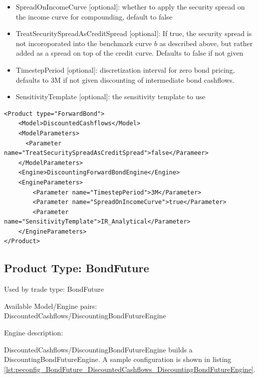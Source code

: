 \begin{itemize}
\item SpreadOnIncomeCurve [optional]: whether to apply the security spread on the income curve for compounding, default to false
\item TreatSecuritySpreadAsCreditSpread [optional]: If true, the security spread is not incoroporated into the benchmark curve $b$
  as described above, but rather added as a spread on top of the credit curve. Defaults to false if not given
\item TimestepPeriod [optional]: discretization interval for zero bond pricing, defaults to 3M if not given
  discounting of intermediate bond cashflows.
\item SensitivityTemplate [optional]: the sensitivity template to use
\end{itemize}

\begin{longlisting}
\begin{verbatim}
<Product type="ForwardBond">
    <Model>DiscountedCashflows</Model>
    <ModelParameters>
      <Parameter name="TreatSecuritySpreadAsCreditSpread">false</Parameer>
    </ModelParameters>
    <Engine>DiscountingForwardBondEngine</Engine>
    <EngineParameters>
        <Parameter name="TimestepPeriod">3M</Parameter>
        <Parameter name="SpreadOnIncomeCurve">true</Parameter>
        <Parameter name="SensitivityTemplate">IR_Analytical</Parameter>
    </EngineParameters>
</Product>
\end{verbatim}
\caption{Configuration for Product ForwardBond, Model DiscountedCashflows, Engine DiscountingForwardBondEngine}
\label{lst:peconfig_ForwardBond_DiscountedCashflows_DiscountingForwardBondEngine}
\end{longlisting}

\subsection{Product Type: BondFuture}

Used by trade type: BondFuture

Available Model/Engine pairs: DiscountedCashflows/DiscountingBondFutureEngine

Engine description:

DiscountedCashflows/DiscountingBondFutureEngine builds a DiscountingBondFutureEngine. A sample configuration is shown
in listing \ref{lst:peconfig_BondFuture_DiscountedCashflows_DiscountingBondFutureEngine}.

